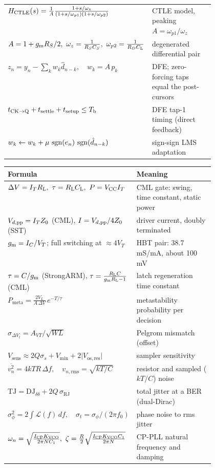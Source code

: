 {\begin{tabularx}{\linewidth}{@{}>{\centering\arraybackslash}p{0.47\linewidth} L@{}}
$H_\mathrm{CTLE}(s)=\frac{1}{A}\frac{1+s/\omega_z}{(1+s/\omega_{p1})(1+s/\omega_{p2})}$ & CTLE model, peaking $A=\omega_{p1}/\omega_z$\\
$A=1+\gm R_S/2,\ \omega_z=\frac{1}{R_SC_S},\ \omega_{p2}=\frac{1}{R_D\CL}$ & degenerated differential pair\\
$z_n=y_n-\sum_k w_k\hat d_{n-k},\quad w_k=A\,p_k$ & DFE; zero-forcing taps equal the post-cursors\\
$t_\mathrm{CK\to Q}+t_\mathrm{settle}+t_\mathrm{setup}\le T_\mathrm{b}$ & DFE tap-1 timing (direct feedback)\\
$w_k\leftarrow w_k+\mu\,\operatorname{sgn}(e_n)\,\operatorname{sgn}(\hat d_{n-k})$ & sign-sign LMS adaptation\\
\bottomrule
\end{tabularx}
}

{\small
\renewcommand{\arraystretch}{1.32}
\begin{tabularx}{\linewidth}{@{}>{\centering\arraybackslash}p{0.47\linewidth} L@{}}
\toprule
\textbf{Formula} & \textbf{Meaning}\\
\midrule
{}
$\Delta V=I_T\RL,\ \tau=\RL\CL,\ P=V_\mathrm{CC}I_T$ & CML gate: swing, time constant, static power\\
$V_{d,\mathrm{pp}}=I_TZ_0$ (CML), $I=V_{d,\mathrm{pp}}/4Z_0$ (SST) & driver current, doubly terminated\\
$g_\mathrm{m}=I_C/V_T$; full switching at $\approx4V_T$ & HBT pair: 38.7\,mS/mA, about 100\,mV\\
$\tau=C/g_\mathrm{m}$ (StrongARM), $\tau=\frac{R_\mathrm{L} C}{g_\mathrm{m}R_\mathrm{L}-1}$ (CML) & latch regeneration time constant\\
$P_\mathrm{meta}=\frac{2V_L}{A\,\Delta V}\,e^{-T/\tau}$ & metastability probability per decision\\
$\sigma_{\Delta V_t}=A_{VT}/\sqrt{WL}$ & Pelgrom mismatch (offset)\\
$V_\mathrm{sens}\approx2Q\sigma_s+V_\mathrm{min}+2\lvert V_\mathrm{os,res}\rvert$ & sampler sensitivity\\
$\overline{v_n^2}=4kTR\,\Delta f,\quad v_{n,\mathrm{rms}}=\sqrt{kT/C}$ & resistor and sampled ($kT/C$) noise\\
$\mathrm{TJ}=\mathrm{DJ}_{\delta\delta}+2Q\,\sigma_\mathrm{RJ}$ & total jitter at a BER (dual-Dirac)\\
$\sigma_\phi^2=2\!\int\!\mathcal{L}(f)\,df,\quad\sigma_t=\sigma_\phi/(2\pi f_0)$ & phase noise to rms jitter\\
$\omega_n=\sqrt{\frac{\Icp\Kvco}{2\pi NC_1}},\ \zeta=\frac{R}{2}\sqrt{\frac{\Icp\Kvco C_1}{2\pi N}}$ & CP-PLL natural frequency and damping\\

\end{tabularx}}
